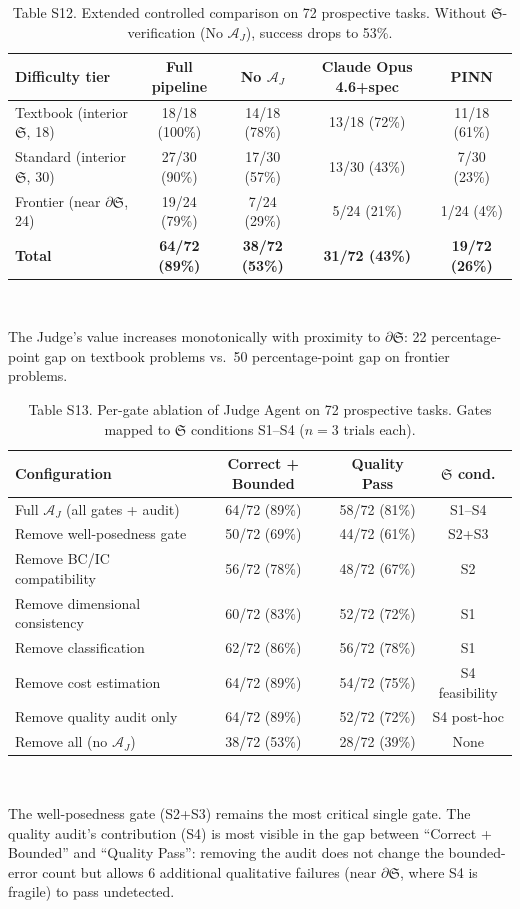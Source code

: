 \documentclass[11pt,a4paper]{article}
\newcommand{\Sclass}{\mathfrak{S}}
\newcommand{\Agent}{\mathcal{A}}
\begin{document}
\begin{table}[htbp]
\centering
\caption{Table S12. Extended controlled comparison on 72 prospective tasks. Without $\Sclass$-verification (No $\Agent_J$), success drops to 53\%.}
\small
\begin{tabularx}{\textwidth}{Xcccc}
\toprule
\textbf{Difficulty tier} & \textbf{Full pipeline} & \textbf{No $\Agent_J$} & \textbf{Claude Opus 4.6+spec} & \textbf{PINN} \\
\midrule
Textbook (interior $\Sclass$, 18) & 18/18 (100\%) & 14/18 (78\%) & 13/18 (72\%) & 11/18 (61\%) \\
Standard (interior $\Sclass$, 30) & 27/30 (90\%) & 17/30 (57\%) & 13/30 (43\%) & 7/30 (23\%) \\
Frontier (near $\partial \Sclass$, 24) & 19/24 (79\%) & 7/24 (29\%) & 5/24 (21\%) & 1/24 (4\%) \\
\midrule
\textbf{Total} & \textbf{64/72 (89\%)} & \textbf{38/72 (53\%)} & \textbf{31/72 (43\%)} & \textbf{19/72 (26\%)} \\
\bottomrule
\end{tabularx}\\[3pt]
\raggedright\scriptsize The Judge's value increases monotonically with proximity to $\partial \Sclass$: 22 percentage-point gap on textbook problems vs.\ 50 percentage-point gap on frontier problems.
\end{table}

\begin{table}[htbp]
\centering
\caption{Table S13. Per-gate ablation of Judge Agent on 72 prospective tasks. Gates mapped to $\Sclass$ conditions S1--S4 ($n = 3$ trials each).}
\small
\begin{tabularx}{\textwidth}{Xccc}
\toprule
\textbf{Configuration} & \textbf{Correct + Bounded} & \textbf{Quality Pass} & \textbf{$\Sclass$ cond.} \\
\midrule
Full $\Agent_J$ (all gates + audit) & 64/72 (89\%) & 58/72 (81\%) & S1--S4 \\
Remove well-posedness gate & 50/72 (69\%) & 44/72 (61\%) & S2+S3 \\
Remove BC/IC compatibility & 56/72 (78\%) & 48/72 (67\%) & S2 \\
Remove dimensional consistency & 60/72 (83\%) & 52/72 (72\%) & S1 \\
Remove classification & 62/72 (86\%) & 56/72 (78\%) & S1 \\
Remove cost estimation & 64/72 (89\%) & 54/72 (75\%) & S4 feasibility \\
Remove quality audit only & 64/72 (89\%) & 52/72 (72\%) & S4 post-hoc \\
Remove all (no $\Agent_J$) & 38/72 (53\%) & 28/72 (39\%) & None \\
\bottomrule
\end{tabularx}\\[3pt]
\raggedright\scriptsize The well-posedness gate (S2+S3) remains the most critical single gate. The quality audit's contribution (S4) is most visible in the gap between ``Correct + Bounded'' and ``Quality Pass'': removing the audit does not change the bounded-error count but allows 6 additional qualitative failures (near $\partial \Sclass$, where S4 is fragile) to pass undetected.
\end{table}
\end{document}
